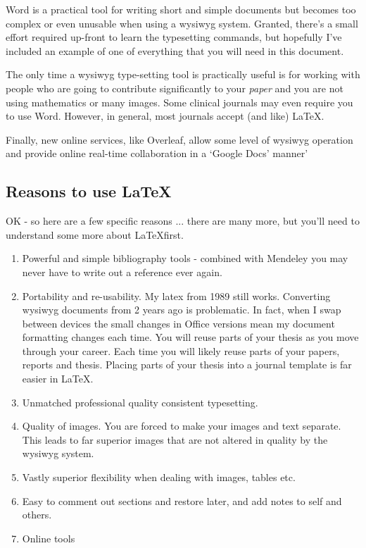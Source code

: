 Word is a practical tool for writing short and simple documents but becomes too complex or even unusable when using a wysiwyg system. Granted, there's a small effort required up-front to learn the typesetting commands, but hopefully I've included an example of one of everything that you will need in this document.

The only time a wysiwyg type-setting tool is practically useful is for working with people who are going to contribute significantly to your {\em paper} and you are not using mathematics or many images. Some clinical journals
may even require you to use Word. However, in general, most journals accept (and like) \LaTeX.

Finally, new online services, like Overleaf, allow some level of wysiwyg operation and provide online real-time collaboration in a `Google Docs' manner'


\subsection{Reasons to use \LaTeX}
OK - so here are a few specific reasons ... there are many more, but you'll need to understand some more about \LaTeX first.
\begin{enumerate}
\item Powerful and simple bibliography tools - combined with Mendeley 
you may never have to write out a reference ever again.
\item Portability and re-usability. My latex from 1989 still works. Converting wysiwyg documents from 2 years ago is problematic. In fact, when I swap between devices the small changes in Office versions mean my document formatting changes each time. You will reuse parts of your thesis as you move through your career. Each time you will likely reuse parts of your papers, reports and thesis. Placing parts of your thesis into a journal template is far easier in \LaTeX.
\item Unmatched professional quality consistent typesetting. 
\item Quality of images. You are forced to make your images and text separate. This leads to far superior images that are not altered in quality by the wysiwyg system.
\item Vastly superior flexibility when dealing with images, tables etc.
\item Easy to comment out sections and restore later, and add notes to self and others. 
\item Online tools
\end{enumerate}


